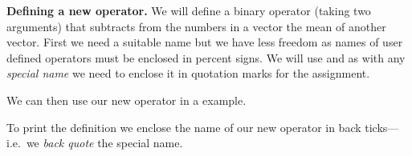 \documentclass[krantz2]{krantz}\usepackage{knitr}%
\begin{document}
\begin{explainbox}
\textbf{Defining a new operator.} We will define a binary operator (taking two arguments) that subtracts from the numbers in a vector the mean of another vector. First we need a suitable name but we have less freedom as names of user defined operators must be enclosed in percent signs. We will use  and as with any \emph{special name} we need to enclose it in quotation marks for the assignment.

\begin{knitrout}\footnotesize
{}\color{fgcolor}
\end{knitrout}

We can then use our new operator in a example.

\begin{knitrout}\footnotesize
{}\color{fgcolor}
\end{knitrout}

To print the definition we enclose the name of our new operator in back ticks---i.e.\ we \emph{back quote} the special name.

\begin{knitrout}\footnotesize
{}\color{fgcolor}
\end{knitrout}

\end{explainbox}
\end{document}
